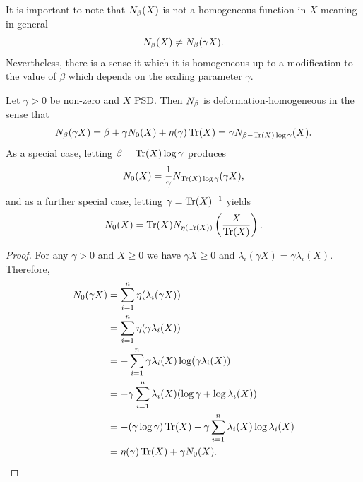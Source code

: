 \documentclass[notitlepage, 10pt]{article}
\begin{document}
It is important to note that $N_{\beta}(X)$ is not a homogeneous function in $X$ meaning in general
\begin{equation}
    N_{\beta}(X) \neq N_{\beta}(\gamma X).
\end{equation}
Nevertheless, there is a sense it which it is homogeneous up to a modification to the value of $\beta$ which depends on the scaling parameter $\gamma$.
\begin{lem}
    \label{lem:deformation_homogeneous}
    Let $\gamma > 0$ be non-zero and $X$ PSD. Then $N_{\beta}$ is deformation-homogeneous in the sense that
    \begin{equation}
        \label{eq:deformation_homogeneous}
        N_{\beta}(\gamma X) = \beta + \gamma N_{0}(X) + \eta(\gamma)\operatorname{Tr}(X) = \gamma N_{\beta - \operatorname{Tr}(X)\log \gamma }(X).
    \end{equation}
    As a special case, letting $\beta = \operatorname{Tr}(X)\log \gamma$ produces
        \begin{equation}
            N_{0}(X) = \frac{1}{\gamma} N_{\operatorname{Tr}(X) \log \gamma}(\gamma X),
        \end{equation}
    and as a further special case, letting $\gamma = \operatorname{Tr}(X)^{-1}$ yields
        \begin{equation}
            N_{0}(X) = \operatorname{Tr}(X) N_{\eta(\operatorname{Tr}(X))}\left(\frac{X}{\operatorname{Tr}(X)}\right).
        \end{equation}
\end{lem}
\begin{proof}
    For any $\gamma > 0$ and $X \geq 0$ we have $\gamma X \geq 0$ and $\lambda_i(\gamma X) = \gamma \lambda_i(X)$.
    Therefore,
    \begin{align}
        \begin{split}
            N_0(\gamma X) 
            &= \sum_{i=1}^{n} \eta(\lambda_i(\gamma X)) \\
            &= \sum_{i=1}^{n} \eta(\gamma \lambda_i(X)) \\
            &= -\sum_{i=1}^{n} \gamma \lambda_i(X) \log (\gamma \lambda_i(X)) \\
            &= -\gamma \sum_{i=1}^{n} \lambda_i(X) (\log \gamma + \log \lambda_i(X)) \\
            &= -(\gamma \log \gamma)\operatorname{Tr}(X) - \gamma \sum_{i=1}^{n} \lambda_i(X) \log \lambda_i(X) \\
            &= \eta(\gamma) \operatorname{Tr}(X) + \gamma N_0(X).
        \end{split}
    \end{align}
\end{proof}
\end{document}

